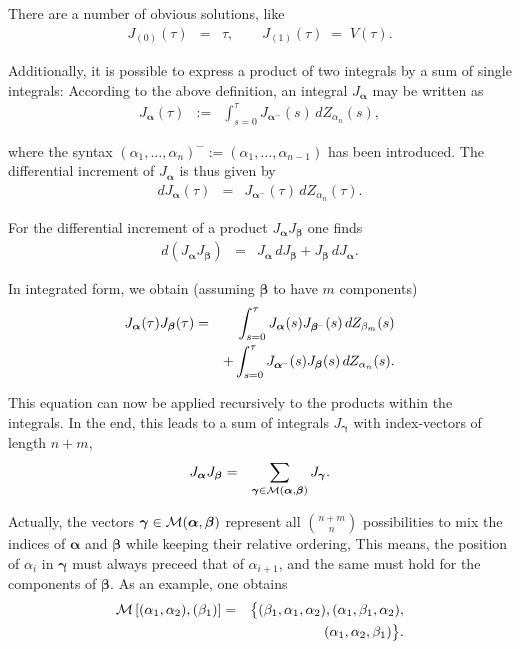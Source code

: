 \documentclass[aps,twocolumn,superscriptaddress,showpacs,showkeys]{revtex4}
\newcommand{\vecalpha}{{\boldsymbol{\alpha}}}
\newcommand{\vecbeta}{{\boldsymbol{\beta}}}
\newcommand{\vecgamma}{{\boldsymbol{\gamma}}}
\begin{document}
\noindent There are a number of obvious solutions, like
%
\begin{eqnarray}
J_{(0)}(\tau) &=& \tau,\qquad J_{(1)}(\tau) \;=\; V(\tau).
\end{eqnarray}

\noindent Additionally, it is possible to express a product of two integrals by a sum of single integrals: According to the
above definition, an integral $J_\vecalpha$ may be written as
%
\begin{eqnarray}
J_{\vecalpha}(\tau) &:=&
\int_{s=0}^{\tau} J_{\vecalpha^{\!-}}(s)\, dZ_{\alpha_n}(s),
\end{eqnarray}

\noindent where the syntax $(\alpha_1,\ldots,\alpha_n)^-\!:=\!(\alpha_1,\ldots,\alpha_{n-1})$ has been introduced.
The differential increment of $J_\vecalpha$ is thus given by
%
\begin{eqnarray}
dJ_\vecalpha(\tau) &=& J_{\vecalpha^{\!-}}(\tau)\, dZ_{\alpha_n}(\tau).
\end{eqnarray}

\noindent For the differential increment of a product $J_\vecalpha J_\vecbeta$ one finds
%
\begin{eqnarray}
d(J_\vecalpha J_\vecbeta) &=& J_\vecalpha\,dJ_\vecbeta+J_\vecbeta\,dJ_\vecalpha.
\end{eqnarray}

\noindent In integrated form, we obtain (assuming $\vecbeta$ to have $m$ components)
%
\begin{eqnarray}
J_\vecalpha(\tau) J_\vecbeta(\tau) &=&
  \int_{s=0}^{\tau} J_{\vecalpha}(s) J_{\vecbeta^{\!-}}(s)\, dZ_{\beta_m}(s) \cr
&& +\int_{s=0}^{\tau} J_{\vecalpha^{\!-}}(s) J_{\vecbeta}(s)\, dZ_{\alpha_n}(s).
\end{eqnarray}

\noindent This equation can now be applied recursively to the products within the integrals. In the end, this leads to
a sum of integrals $J_\vecgamma$ with index-vectors of length $n+m$,
%
\begin{eqnarray}
J_\vecalpha J_\vecbeta &=& \sum_{\vecgamma\in{\cal M}(\vecalpha,\vecbeta)} J_\vecgamma.
\end{eqnarray}

\noindent Actually, the vectors $\vecgamma\in{\cal M}(\vecalpha,\vecbeta)$ represent all ${n+m\choose n}$ possibilities
to mix the indices of $\vecalpha$ and $\vecbeta$ while keeping their relative ordering, This means, the position of
$\alpha_i$ in $\vecgamma$ must always preceed that of $\alpha_{i+1}$, and the same must hold for the components of
$\vecbeta$. As an example, one obtains
%
\begin{eqnarray}
{\cal M}\left[(\alpha_1,\alpha_2),(\beta_1)\right] &=&
\big\{ (\beta_1,\alpha_1,\alpha_2), (\alpha_1,\beta_1,\alpha_2),\cr&& \;\;(\alpha_1,\alpha_2,\beta_1) \big\}.
\end{eqnarray}
\end{document}
